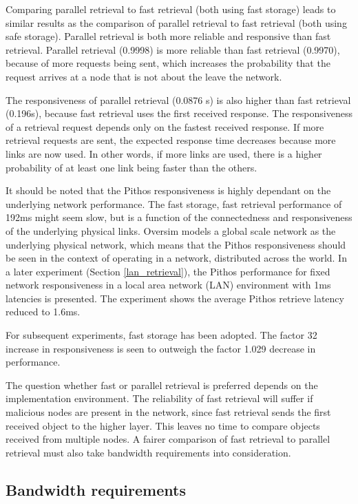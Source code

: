 Comparing parallel retrieval to fast retrieval (both using fast storage) leads to similar results as the comparison of parallel retrieval to fast retrieval (both using safe storage). Parallel retrieval is both more reliable and responsive than fast retrieval. Parallel retrieval (0.9998) is more reliable than fast retrieval (0.9970), because of more requests being sent, which increases the probability that the request arrives at a node that is not about the leave the network.

The responsiveness of parallel retrieval (0.0876 s) is also higher than fast retrieval (0.196s), because fast retrieval uses the first received response. The responsiveness of a retrieval request depends only on the fastest received response. If more retrieval requests are sent, the expected response time decreases because more links are now used. In other words, if more links are used, there is a higher probability of at least one link being faster than the others.

It should be noted that the Pithos responsiveness is highly dependant on the underlying network performance. The fast storage, fast retrieval performance of 192ms might seem slow, but is a function of the connectedness and responsiveness of the underlying physical links. Oversim models a global scale network as the underlying physical network, which means that the Pithos responsiveness should be seen in the context of operating in a network, distributed across the world. In a later experiment (Section \ref{lan_retrieval}), the Pithos performance for fixed network responsiveness in a local area network (LAN) environment with 1ms latencies is presented. The experiment shows the average Pithos retrieve latency reduced to 1.6ms.

For subsequent experiments, fast storage has been adopted. The factor 32 increase in responsiveness is seen to outweigh the factor 1.029 decrease in performance.

The question whether fast or parallel retrieval is preferred depends on the implementation environment. The reliability of fast retrieval will suffer if malicious nodes are present in the network, since fast retrieval sends the first received object to the higher layer. This leaves no time to compare objects received from multiple nodes. A fairer comparison of fast retrieval to parallel retrieval must also take bandwidth requirements into consideration.

\subsection{Bandwidth requirements}
\label{bandwidth_requirements}

